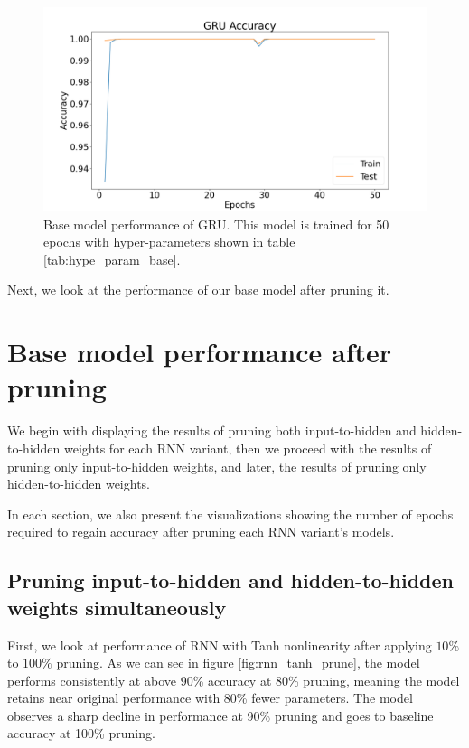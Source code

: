 \begin{figure}[h]
	\centering
	\includegraphics[width=0.82\linewidth]{images/results/base_model/gru_accuracy.png}
	\caption[GRU base model performance]%
	{Base model performance of GRU. This model is trained for 50 epochs with hyper-parameters shown in table \ref{tab:hype_param_base}.}
	\label{fig:gru_bm}
\end{figure}

Next, we look at the performance of our base model after pruning it.


\section{Base model performance after pruning}

We begin with displaying the results of pruning both input-to-hidden and hidden-to-hidden weights for each RNN variant, then we proceed with the results of pruning only input-to-hidden weights, and later, the results of pruning only hidden-to-hidden weights.

In each section, we also present the visualizations showing the number of epochs required to regain accuracy after pruning each RNN variant's models.

\subsection[Pruning both, input-to-hidden and hidden-to-hidden weights]{Pruning input-to-hidden and hidden-to-hidden weights simultaneously}

First, we look at performance of RNN with Tanh nonlinearity after applying $10\%$ to $100\%$ pruning. As we can see in figure \ref{fig:rnn_tanh_prune}, the model performs consistently at above 90\% accuracy at 80\% pruning, meaning the model retains near original performance with 80\% fewer parameters. The model observes a sharp decline in performance at 90\% pruning and goes to baseline accuracy at 100\% pruning.

